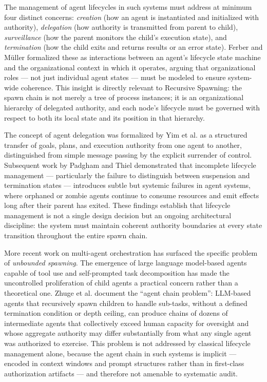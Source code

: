 The management of agent lifecycles in such systems must address at minimum four distinct concerns: \emph{creation} (how an agent is instantiated and initialized with authority), \emph{delegation} (how authority is transmitted from parent to child), \emph{surveillance} (how the parent monitors the child's execution state), and \emph{termination} (how the child exits and returns results or an error state). Ferber and M\"uller \cite{ferber1996} formalized these as interactions between an agent's lifecycle state machine and the organizational context in which it operates, arguing that organizational roles — not just individual agent states — must be modeled to ensure system-wide coherence. This insight is directly relevant to Recursive Spawning: the spawn chain is not merely a tree of process instances; it is an organizational hierarchy of delegated authority, and each node's lifecycle must be governed with respect to both its local state and its position in that hierarchy.

The concept of agent delegation was formalized by Yim et al. \cite{yim1997} as a structured transfer of goals, plans, and execution authority from one agent to another, distinguished from simple message passing by the explicit surrender of control. Subsequent work by Padgham and Thiel \cite{padgham2001} demonstrated that incomplete lifecycle management — particularly the failure to distinguish between suspension and termination states — introduces subtle but systemic failures in agent systems, where orphaned or zombie agents continue to consume resources and emit effects long after their parent has exited. These findings establish that lifecycle management is not a single design decision but an ongoing architectural discipline: the system must maintain coherent authority boundaries at every state transition throughout the entire spawn chain.

More recent work on multi-agent orchestration has surfaced the specific problem of \emph{unbounded spawning}. The emergence of large language model-based agents capable of tool use and self-prompted task decomposition has made the uncontrolled proliferation of child agents a practical concern rather than a theoretical one. Zhuge et al. \cite{zhuge2024} document the ``agent chain problem'': LLM-based agents that recursively spawn children to handle sub-tasks, without a defined termination condition or depth ceiling, can produce chains of dozens of intermediate agents that collectively exceed human capacity for oversight and whose aggregate authority may differ substantially from what any single agent was authorized to exercise. This problem is not addressed by classical lifecycle management alone, because the agent chain in such systems is implicit — encoded in context windows and prompt structures rather than in first-class authorization artifacts — and therefore not amenable to systematic audit.

